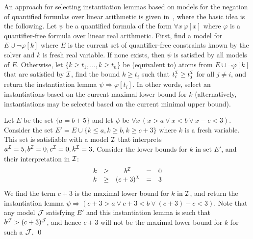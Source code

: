 \documentclass{easychair}
\begin{document}
An approach for selecting instantiation lemmas based on models for the negation of quantified formulas
over linear arithmetic is given in~\cite{InstLA2016}, where the basic idea is the following.
Let $\psi$ be a quantified formula of the form $\forall x\, \varphi[ x ]$ where $\varphi$ is a quantifier-free formula over linear real arithmetic.
First, find a model for $E \cup \neg \varphi[ k ]$ where $E$ is the current set of quantifier-free constraints known by the solver and $k$ is fresh real variable.
If none exists, then $\psi$ is satisfied by all models of $E$.
Otherwise, let $\{ k \geq t_1, \ldots, k \geq t_n \}$ be (equivalent to) atoms from $E \cup \neg \varphi[ k ]$ that are satisfied by $\mathcal{I}$,
find the bound $k \geq t_i$ such that $t_i^{\mathcal{I}} \geq t_j^{\mathcal{I}}$ for all $j \neq i$,
and return the instantiation lemma $\psi \Rightarrow \varphi[ t_i ]$.
In other words, select an instantiations based on the current maximal lower bound for $k$ (alternatively, instantiations may be selected based on the current minimal upper bound).

\begin{example}
\label{ex:cegqi}
Let $E$ be the set $\{ a=b+5 \}$ and let $\psi$ be $\forall x\, (x>a \vee x<b \vee x-c<3)$.
Consider the set $E' = E \cup \{ k \leq a, k \geq b, k \geq c+3 \}$ where $k$ is a fresh variable.
This set is satisfiable with a model $\mathcal{I}$ that interprets $a^{\mathcal{I}} = 5, b^{\mathcal{I}} = 0, c^{\mathcal{I}} = 0, k^{\mathcal{I}} = 3$.
Consider the lower bounds for $k$ in set $E'$, and their interpretation in $\mathcal{I}$:
\[
\begin{array}{ccccc}
k & \geq & b^{\mathcal{I}} & = & 0 \\
k & \geq & (c+3)^{\mathcal{I}} & = & 3 \\
\end{array}
\]
We find the term $c+3$ is the maximal lower bound for $k$ in $\mathcal{I}$,
and return the instantiation lemma $\psi \Rightarrow ( c+3>a \vee c+3<b \vee (c+3)-c<3 )$.
Note that any model $\mathcal{J}$ satisfying $E'$ and this instantiation lemma is such that $b^{\mathcal{J}} > (c+3)^{\mathcal{J}}$,
and hence $c+3$ will not be the maximal lower bound for $k$ for such a $\mathcal{J}$.
\qed
\end{example}
\end{document}
